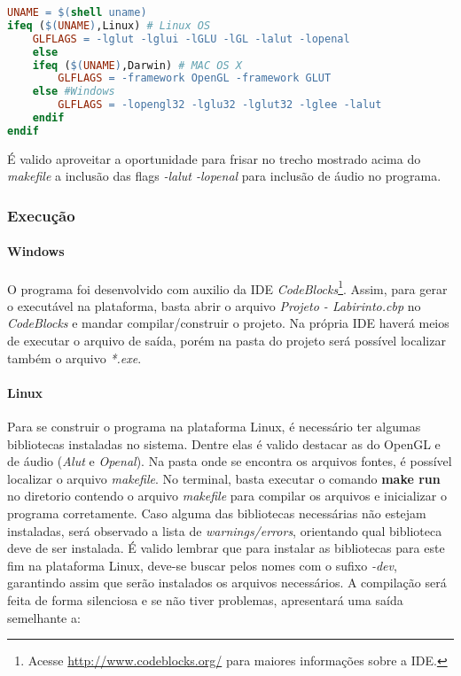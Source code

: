 \begin{lstlisting}[language=make,title=\textit{Makefile},firstnumber=8,numbers=none]
UNAME = $(shell uname)
ifeq ($(UNAME),Linux) # Linux OS
	GLFLAGS = -lglut -lglui -lGLU -lGL -lalut -lopenal
	else
	ifeq ($(UNAME),Darwin) # MAC OS X
		GLFLAGS = -framework OpenGL -framework GLUT
	else #Windows
		GLFLAGS = -lopengl32 -lglu32 -lglut32 -lglee -lalut
	endif
endif
\end{lstlisting}

É valido aproveitar a oportunidade para frisar no trecho mostrado acima do \textit{makefile} a inclusão das flags \textit{-lalut -lopenal} para inclusão de áudio no programa.

\subsubsection{Execução}\label{exe}

\paragraph{\textbf{Windows}}

O programa foi desenvolvido com auxilio da IDE \textit{CodeBlocks}\footnote{Acesse \url{http://www.codeblocks.org/} para maiores informações sobre a IDE.}. Assim, para gerar o executável na plataforma, basta abrir o arquivo \textit{Projeto - Labirinto.cbp} no \textit{CodeBlocks} e mandar compilar/construir o projeto. Na própria IDE haverá meios de executar o arquivo de saída, porém na pasta do projeto será possível localizar também o arquivo \textit{*.exe}.

\paragraph{\textbf{Linux}}

Para se construir o programa na plataforma Linux, é necessário ter algumas bibliotecas instaladas no sistema. Dentre elas é valido destacar as do OpenGL e de áudio (\textit{Alut} e \textit{Openal}). Na pasta onde se encontra os arquivos fontes, é possível localizar o arquivo \textit{makefile}. No terminal, basta executar o comando \textbf{make run} no diretorio contendo o arquivo \textit{makefile} para compilar os arquivos e inicializar o programa corretamente. Caso alguma das bibliotecas necessárias não estejam instaladas, será observado a lista de \textit{warnings/errors}, orientando qual biblioteca deve de ser instalada. É valido lembrar que para instalar as bibliotecas para este fim na plataforma Linux, deve-se buscar pelos nomes com o sufixo \textit{-dev}, garantindo assim que serão instalados os arquivos necessários. A compilação será feita de forma silenciosa e se não tiver problemas, apresentará uma saída semelhante a:

